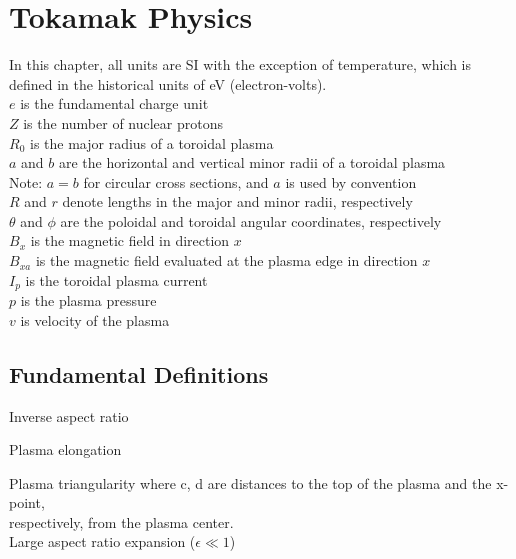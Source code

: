 \chapter{Tokamak Physics}
In this chapter, all units are SI with the exception of temperature,
which is defined in the historical units of eV (electron-volts).\\

\noindent
$e$ is the fundamental charge unit\\
$Z$ is the number of nuclear protons\\
$R_0$ is the major radius of a toroidal plasma\\
$a$ and $b$ are the horizontal and vertical minor radii of a toroidal plasma\\
\indent Note: $a=b$ for circular cross sections, and $a$ is used by convention\\
$R$ and $r$ denote lengths in the major and minor radii, respectively\\
$\theta$ and $\phi$ are the poloidal and toroidal angular coordinates, respectively\\
$B_x$ is the magnetic field in direction $x$\\
$B_{xa}$ is the magnetic field evaluated at the plasma edge in direction $x$\\
$I_p$ is the toroidal plasma current\\
$p$ is the plasma pressure\\
$v$ is velocity of the plasma\\

\section{Fundamental Definitions}

\index{$\epsilon$}
\noindent
Inverse aspect ratio 

\noindent
Plasma elongation 

\noindent
Plasma triangularity 
\indent where c, d are distances to the top of the plasma and the x-point, \\
\indent respectively, from the plasma center.\\

\noindent
Large aspect ratio expansion ($\epsilon \ll 1$) 

